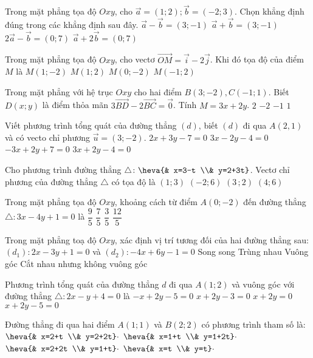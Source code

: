 \begin{ex}
Trong mặt phẳng tọa độ $Oxy$, cho $\vec{a}=(1;2);\vec{b}=(-2;3)$. Chọn khẳng định đúng trong các khẳng định sau đây.
\choice
{$\vec{a}-\vec{b}=(3;-1)$}
{$\vec{a}+\vec{b}=(3;-1)$}
{$2\vec{a}-\vec{b}=(0;7)$}
{$\vec{a}+2\vec{b}=(0;7)$}
\end{ex}
\begin{ex}
Trong mặt phẳng tọa độ $Oxy$, cho vectơ $\vec{OM}=\vec{i}-2\vec{j}$. Khi đó tọa độ của điểm $M$ là
\choice
{$M(1;-2)$}
{$M(1;2)$}
{$M(0;-2)$}
{$M(-1;2)$}
\end{ex}
\begin{ex}
Trong mặt phẳng với hệ trục $Oxy$ cho hai điểm $B(3;-2),C(-1;1)$. Biết $D(x;y)$ là điểm thỏa mãn $3\vec{BD}-2\vec{BC}=\vec{0}$. Tính $M=3x+2y$.
\choice
{$2$}
{$-2$}
{$-1$}
{$1$}
\end{ex}
\begin{ex}
Viết phương trình tổng quát của đường thẳng $(d)$, biết $(d)$ đi qua $A\left(2{,}1\right)$ và có vecto chỉ phương $\vec{u}=(3;-2)$.
\choice
{$2x+3y-7=0$}
{$3x-2y-4=0$}
{$-3x+2y+7=0$}
{$3x+2y-4=0$}
\end{ex}
\begin{ex}
Cho phương trình đường thẳng $\triangle \colon \heva{& x=3-t \\& y=2+3t}$. Vectơ chỉ phương của đường thẳng $\triangle $ có tọa độ là
\choice
{$(1;3)$}
{$(-2;6)$}
{$\left(3\,;2\right)$}
{$(4;6)$}
\end{ex}
\begin{ex}
Trong mặt phẳng tọa độ $Oxy$, khoảng cách từ điểm $A(0;-2)$ đến đường thẳng $\triangle \colon 3x-4y+1=0$ là
\choice
{$\dfrac{9}{5}$}
{$\dfrac{7}{5}$}
{$\dfrac{3}{5}$}
{$\dfrac{12}{5}$}
\end{ex}
\begin{ex}
Trong mặt phẳng toạ độ $Oxy$, xác định vị trí tương đối của hai đường thẳng sau: $\left(d_1\right)\colon 2x-3y+1=0$ và $\left(d_2\right)\colon -4x+6y-1=0$
\choice
{Song song}
{Trùng nhau}
{Vuông góc}
{Cắt nhau nhưng không vuông góc}
\end{ex}
\begin{ex}
Phương trình tổng quát của đường thẳng $d$ đi qua $A(1;2)$ và vuông góc với đường thẳng $\triangle \colon 2x-y+4=0$ là
\choice
{$-x+2y-5=0$}
{$x+2y-3=0$}
{$x+2y=0$}
{$x+2y-5=0$}
\end{ex}
\begin{ex}
Đường thẳng đi qua hai điểm $A(1;1)$ và $B(2;2)$ có phương trình tham số là:
\choice
{$\heva{& x=2+t \\& y=2+2t}\cdot $}
{$\heva{& x=1+t \\& y=1+2t}\cdot $}
{$\heva{& x=2+2t \\& y=1+t}\cdot $}
{$\heva{& x=t \\& y=t}\cdot $}
\end{ex}
